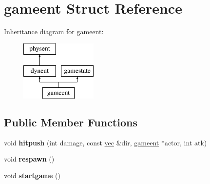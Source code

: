 \hypertarget{structgameent}{}\section{gameent Struct Reference}
\label{structgameent}
Inheritance diagram for gameent\+:\begin{figure}[H]
\begin{center}
\leavevmode
\includegraphics[height=3.000000cm]{structgameent}
\end{center}
\end{figure}
\subsection*{Public Member Functions}
\begin{DoxyCompactItemize}
\item 
\mbox{\label{structgameent_a4f8f44b2ea1dad8492834cc90ba46c8a}} 
void {\bfseries hitpush} (int damage, const \hyperlink{structvec}{vec} \&dir, \hyperlink{structgameent}{gameent} $\ast$actor, int atk)
\item 
\mbox{\label{structgameent_aca144489558ae47e1ace5a4f83bacd6e}} 
void {\bfseries respawn} ()
\item 
\mbox{\label{structgameent_a0522825681e5157265754dcc230100cd}} 
void {\bfseries startgame} ()
\end{DoxyCompactItemize}
